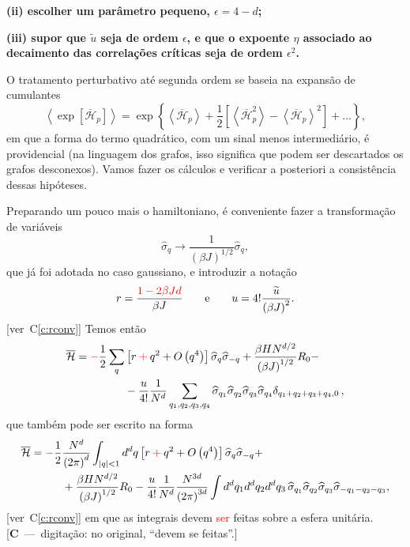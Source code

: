 \documentclass[12pt,a4paper]{article}
\newcommand{\Hb}{\overline{\mathcal{H}}}
\newcommand{\sh}{\widehat{\sigma}}
\newcommand{\corr}[1]{\textcolor{red}{#1}}
\newcommand{\cmais}{\mathbin{\textcolor{red}{+}}}
\newcounter{corr}
\newcommand{\nota}[2]{\refstepcounter{corr}\label{#1}%
  {\color{red}\small[\textbf{C\thecorr}~---~#2]}}
\newcommand{\ver}[1]{{\color{red}\small[ver~C\ref{#1}]}}
\begin{document}
\textbf{(ii) escolher um parâmetro pequeno, $\epsilon=4-d$;}

\textbf{(iii) supor que $\widetilde u$ seja de ordem $\epsilon$, e que o expoente $\eta$ associado
ao decaimento das correlações críticas seja de ordem $\epsilon^2$.}

O tratamento perturbativo até segunda ordem se baseia na expansão de
cumulantes
\begin{equation}
\left\langle\exp\left[\Hb_p\right]\right\rangle=\exp\left\{\left\langle\Hb_p\right\rangle+\frac12\left[\left\langle\Hb_p^2\right\rangle-\left\langle\Hb_p\right\rangle^2\right]+...\right\},
\end{equation}
em que a forma do termo quadrático, com um sinal menos intermediário, é
providencial (na linguagem dos grafos, isso significa que podem ser
descartados os grafos desconexos). Vamos fazer os cálculos e verificar a posteriori a
consistência dessas hipóteses.

Preparando um pouco mais o hamiltoniano, é conveniente fazer a
transformação de variáveis
\begin{equation}
\sh_q\to\frac{1}{\left(\beta J\right)^{1/2}}\sh_q,
\end{equation}
que já foi adotada no caso gaussiano, e introduzir a notação
\begin{equation}
r=\frac{\corr{1-2\beta Jd}}{\beta J}\qquad\text{e}\qquad u=4!\frac{\widetilde u}{\left(\beta J\right)^2}.
\end{equation}
\ver{c:rconv}
Temos então
\begin{equation}
\begin{split}
\Hb=\corr{-}\frac12\sum_q&\left[r\cmais q^2+O\left(q^4\right)\right]\sh_q\sh_{-q}+\frac{\beta HN^{d/2}}{\left(\beta J\right)^{1/2}}R_0-\\
&-\frac{u}{4!}\frac{1}{N^d}\sum_{q_1,q_2,q_3,q_4}\sh_{q_1}\sh_{q_2}\sh_{q_3}\sh_{q_4}\delta_{q_1+q_2+q_3+q_4,0}\,,
\end{split}
\end{equation}
que também pode ser escrito na forma
\begin{equation}
\begin{split}
\Hb=\corr{-}\frac12&\frac{N^d}{\left(2\pi\right)^d}\int_{|q|<1}d^dq\left[r\cmais q^2+O\left(q^4\right)\right]\sh_q\sh_{-q}+\\
&+\frac{\beta HN^{d/2}}{\left(\beta J\right)^{1/2}}R_0-\frac{u}{4!}\frac{1}{N^d}\frac{N^{3d}}{\left(2\pi\right)^{3d}}\int d^dq_1d^dq_2d^dq_3\,\sh_{q_1}\sh_{q_2}\sh_{q_3}\sh_{-q_1-q_2-q_3},
\end{split}
\end{equation}
\ver{c:rconv}
em que as integrais devem \corr{ser} feitas sobre a esfera unitária.
\nota{c:sefeitas}{digitação: no original, ``devem se feitas''.}
\end{document}
